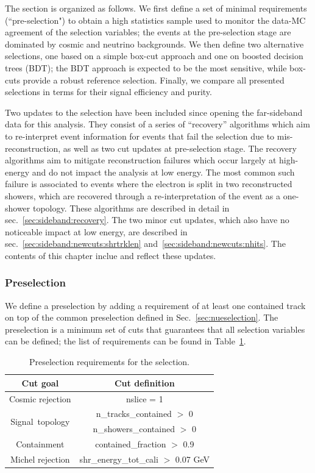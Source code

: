 The section is organized as follows. We first define a set of minimal requirements (``pre-selection") to obtain a high statistics sample used to monitor the data-MC agreement of the selection variables;
the events at the pre-selection stage are dominated by cosmic and neutrino backgrounds. We then define two alternative selections, one based on a simple box-cut approach and one on boosted decision trees (BDT); the BDT approach is expected to be the most sensitive, while box-cuts provide a robust reference selection. Finally, we compare all presented selections in terms for their signal efficiency and purity.

Two updates to the selection have been included since opening the far-sideband data for this analysis. They consist of a series of ``recovery'' algorithms which aim to re-interpret event information for events that fail the selection due to mis-reconstruction, as well as two cut updates at pre-selection stage. The recovery algorithms aim to mitigate reconstruction failures which occur largely at high-energy and do not impact the analysis at low energy. The most common such failure is associated to events where the electron is split in two reconstructed showers, which are recovered through a re-interpretation of the event as a one-shower topology. These algorithms are described in detail in sec.~\ref{sec:sideband:recovery}. The two minor cut updates, which also have no noticeable impact at low energy, are described in sec.~\ref{sec:sideband:newcuts:shrtrklen}
 and~\ref{sec:sideband:newcuts:nhits}. The contents of this chapter inclue and reflect these updates.
 
\subsubsection{Preselection}

We define a \npsel preselection by adding a requirement of at least one contained track on top of the common \nue preselection defined in Sec.~\ref{sec:nueselection}. 
The \npsel preselection is a minimum set of cuts that guarantees that all selection variables can be defined; the list of requirements can be found in Table~\ref{tab:1eNp:presel}.

\begin{table}[h!]
\centering
\setlength{\tabcolsep}{10pt}
\renewcommand{\arraystretch}{1.25}
 \begin{tabular}{| c | c |} 
 \hline
 Cut goal & Cut definition \\
 \hline\hline
Cosmic rejection & nslice = 1 \\
 \hline
\multirow{2}{*}{Signal~topology} & n\_tracks\_contained $>$ 0 \\
 & n\_showers\_contained $>$ 0 \\
 \hline
Containment & contained\_fraction $>$ 0.9 \\
 \hline
Michel rejection & shr\_energy\_tot\_cali $>$ 0.07 GeV \\
 \hline
 \end{tabular}
 \caption{\label{tab:1eNp:presel} Preselection requirements for the \npsel selection.}
\end{table}

